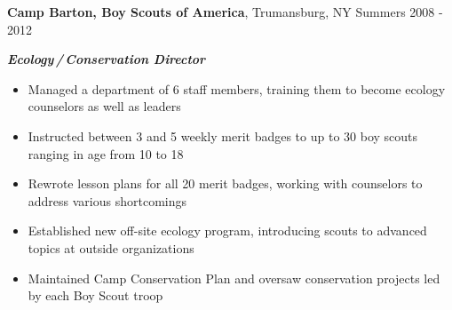 
\vspace{7pt}

\textbf{Camp Barton, Boy Scouts of America}, Trumansburg, NY \hfill Summers 2008 - 2012

\textbf{\textit{Ecology\,/\,Conservation Director}}

\begin{itemize}
    \item Managed a department of 6 staff members, training them to become ecology counselors as well as leaders
    \item Instructed between 3 and 5 weekly merit badges to up to 30 boy scouts ranging in age from 10 to 18
    \item Rewrote lesson plans for all 20 merit badges, working with counselors to address various shortcomings
    \item Established new off-site ecology program, introducing scouts to advanced topics at outside organizations
    \item Maintained Camp Conservation Plan and oversaw conservation projects led by each Boy Scout troop
\end{itemize}
